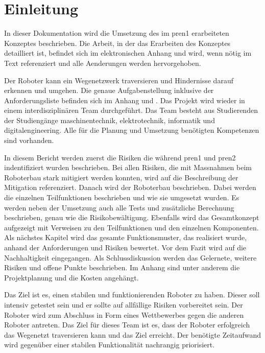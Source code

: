 \section{Einleitung}

In dieser Dokumentation wird die Umsetzung des im \acrfull{pren1} erarbeiteten Konzeptes beschrieben. 
Die Arbeit, in der das Erarbeiten des Konzeptes detailliert ist, befindet sich im elektronischen Anhang und wird, wenn nötig im Text referenziert und alle Aenderungen werden hervorgehoben.

Der Roboter kann ein Wegenetzwerk traversieren und Hindernisse darauf erkennen und umgehen. Die genaue Aufgabenstellung inklusive der Anforderungsliste befinden sich im Anhang  und . Das Projekt wird wieder in einem interdisziplinären Team durchgeführt. Das Team besteht aus Studierenden der Studiengänge \acrfull{maschinentechnik}, \acrfull{elektrotechnik}, \acrfull{informatik} und \acrfull{digitalengineering}. Alle für die Planung und Umsetzung benötigten Kompetenzen sind vorhanden.

In diesem Bericht werden zuerst die Risiken die während \acrshort{pren1} und \acrshort{pren2} indentifiziert wurden beschrieben. Bei allen Risiken, die mit Massnahmen beim Roboterbau stark mitigiert werden konnten, wird auf die Beschreibung der Mitigation referenziert. Danach wird der Roboterbau beschrieben. Dabei werden die einzelnen Teilfunktionen beschrieben und wie sie umgesetzt wurden. Es werden neben der Umsetzung auch alle Tests und zusätzliche Berechnung beschrieben, genau wie die Risikobewältigung. Ebenfalls wird das Gesamtkonzept aufgezeigt mit Verweisen zu den Teilfunktionen und den einzelnen Komponenten. Als nächstes Kapitel wird das gesamte Funktionsmuster, das realisiert wurde, anhand der Anforderungen und Risiken bewertet. Vor dem Fazit wird auf die Nachhaltigkeit eingegangen. Als Schlussdiskussion werden das Gelernete, weitere Risiken und offene Punkte beschrieben. Im Anhang sind unter anderem die Projektplanung und die Kosten angehängt.


Das Ziel ist es, einen stabilen und funktionierenden Roboter zu haben. Dieser soll intensiv getestet sein und er sollte auf allfällige Risiken vorbereitet sein. Der Roboter wird zum Abschluss in Form eines Wettbewerbes gegen die anderen Roboter antreten. Das Ziel für dieses Team ist es, dass der Roboter erfolgreich das Wegenetzt traversieren kann und das Ziel erreicht. Der benötigte Zeitaufwand wird gegenüber einer stabilen Funktionalität nachrangig priorisiert.
